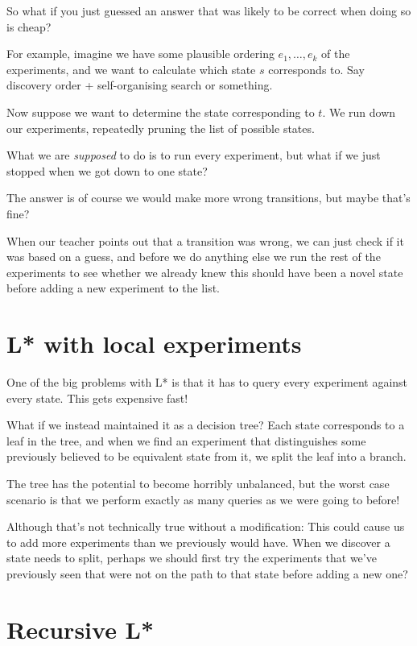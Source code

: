\documentclass[a4paper]{book}
\begin{document}
So what if you just guessed an answer that was likely to be correct when doing so is cheap?

For example, imagine we have some plausible ordering \(e_1, \ldots, e_k\) of the experiments,
and we want to calculate which state \(s\) corresponds to.
Say discovery order + self-organising search or something.

Now suppose we want to determine the state corresponding to \(t\).
We run down our experiments,
repeatedly pruning the list of possible states.

What we are \emph{supposed} to do is to run every experiment,
but what if we just stopped when we got down to one state?

The answer is of course we would make more wrong transitions,
but maybe that's fine?

When our teacher points out that a transition was wrong,
we can just check if it was based on a guess,
and before we do anything else we run the rest of the experiments to see whether we already knew this should have been a novel state before adding a new experiment to the list.

\section{L* with local experiments}\label{sec:lstarlocal}

One of the big problems with L* is that it has to query every experiment against every state.
This gets expensive fast!

What if we instead maintained it as a decision tree?
Each state corresponds to a leaf in the tree,
and when we find an experiment that distinguishes some previously believed to be equivalent state from it,
we split the leaf into a branch.

The tree has the potential to become horribly unbalanced,
but the worst case scenario is that we perform exactly as many queries as we were going to before!

Although that's not technically true without a modification:
This could cause us to add more experiments than we previously would have.
When we discover a state needs to split,
perhaps we should first try the experiments that we've previously seen that were not on the path to that state before adding a new one?

\section{Recursive L*}
\end{document}
